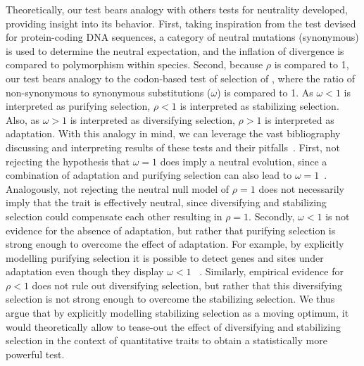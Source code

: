 \documentclass{article}
\newcommand{\NI}{\rho}
\begin{document}
Theoretically, our test bears analogy with others tests for neutrality developed, providing insight into its behavior.
First, taking inspiration from the \textcite{mcdonald_adaptative_1991} test devised for protein-coding DNA sequences, a category of neutral mutations (synonymous) is used to determine the neutral expectation, and the inflation of divergence is compared to polymorphism within species.
Second, because $\NI$ is compared to 1, our test bears analogy to the codon-based test of selection of \textcite{goldman_codonbased_1994, muse_likelihood_1994}, where the ratio of non-synonymous to synonymous substitutions ($\omega$) is compared to 1.
As $\omega < 1$ is interpreted as purifying selection, $\NI < 1$ is interpreted as stabilizing selection.
Also, as $\omega > 1$ is interpreted as diversifying selection, $\NI > 1$ is interpreted as adaptation.
With this analogy in mind, we can leverage the vast bibliography discussing and interpreting results of these tests and their pitfalls~\cite{nielsen_molecular_2005, anisimova_investigating_2009, jensen_importance_2019}.
First, not rejecting the hypothesis that $\omega = 1$ does imply a neutral evolution, since a combination of adaptation and purifying selection can also lead to $\omega = 1$~\cite{nielsen_molecular_2005}.
Analogously, not rejecting the neutral null model of $\NI = 1$ does not necessarily imply that the trait is effectively neutral, since diversifying and stabilizing selection could compensate each other resulting in $\NI = 1$.
Secondly, $\omega < 1$ is not evidence for the absence of adaptation, but rather that purifying selection is strong enough to overcome the effect of adaptation.
For example, by explicitly modelling purifying selection it is possible to detect genes and sites under adaptation even though they display $\omega < 1$ ~\cite{latrille_genes_2023}.
Similarly, empirical evidence for $\NI < 1$ does not rule out diversifying selection, but rather that this diversifying selection is not strong enough to overcome the stabilizing selection.
We thus argue that by explicitly modelling stabilizing selection as a moving optimum, it would theoretically allow to tease-out the effect of diversifying and stabilizing selection in the context of quantitative traits to obtain a statistically more powerful test.
\end{document}
